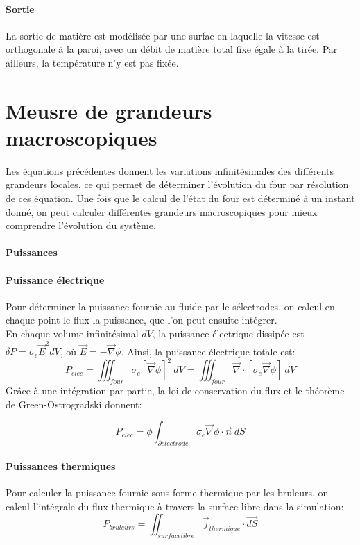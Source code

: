 \documentclass[12pt, a4paper, french, BCOR = 0pt, DIV = 10]{scrartcl}
\begin{document}
    \paragraph{Sortie}
    La sortie de matière est modélisée par une surfae en laquelle la vitesse est orthogonale à la paroi, avec un débit de matière total fixe égale à la tirée. Par ailleurs, la température n'y est pas fixée.


    
    \section{Meusre de grandeurs macroscopiques}
    Les équations précédentes donnent les variations infinitésimales des différents grandeurs locales, ce qui permet de déterminer l'évolution du four par résolution de ces équation. Une fois que le calcul de l'état du four est déterminé à un instant donné, on peut calculer différentes grandeurs macroscopiques pour mieux comprendre l'évolution du système.

    \paragraph{Puissances}
    \paragraph{Puissance électrique}Pour déterminer la puissance fournie au fluide par le sélectrodes, on calcul en chaque point le flux la puissance, que l'on peut ensuite intégrer.\\
    En chaque volume infinitésimal $dV$, la puissance électrique dissipée est $\delta P = \sigma_{e} \vec{E}^{2} dV$, où $\vec{E} = -\vec{\nabla} \phi$. Ainsi, la puissance électrique totale est:
    $$
    P_{elec}=\iiint_{four} \sigma_{e}\left[\vec \nabla\phi\right]^2~dV  = \iiint_{four} \vec \nabla \cdot \left[\sigma_{e}\vec \nabla\phi\right]~dV
    $$
    Grâce à une intégration par partie, la loi de conservation du flux et le théorème de Green-Ostrogradski donnent:

    $$P_{elec}=\phi \int_{\partial electrode} \sigma_{e} \vec \nabla\phi \cdot \vec{n}~dS
    $$

    \paragraph{Puissances thermiques}
    Pour calculer la puissance fournie sous forme thermique par les bruleurs, on calcul l'intégrale du flux thermique à travers la surface libre dans la simulation:
    $$
        P_{bruleurs} = \iint_{surface libre} \vec{j}_{thermique} \cdot \vec{dS}
    $$
\end{document}
